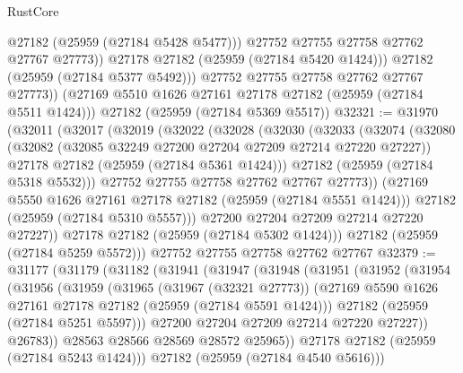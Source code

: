 \begin{lexlean}{RustCore}
\begin{coremodule}
                  @27182
                  (@25959 (@27184 @5428 @5477)))
                @27752
                @27755
                @27758
                @27762
                @27767
                @27773))
            @27178
            @27182
            (@25959 (@27184 @5420 @1424)))
          @27182
          (@25959 (@27184 @5377 @5492)))
        @27752
        @27755
        @27758
        @27762
        @27767
        @27773))
    (@27169 @5510 @1626 @27161 @27178 @27182 (@25959 (@27184 @5511 @1424)))
    @27182
    (@25959 (@27184 @5369 @5517))
@32321 := @31970
    (@32011
      (@32017
        (@32019
          (@32022
            (@32028
              (@32030
                (@32033
                  (@32074
                    (@32080
                      (@32082 (@32085 @32249 @27200 @27204 @27209 @27214 @27220 @27227))
                      @27178
                      @27182
                      (@25959 (@27184 @5361 @1424)))
                    @27182
                    (@25959 (@27184 @5318 @5532)))
                  @27752
                  @27755
                  @27758
                  @27762
                  @27767
                  @27773))
              (@27169 @5550 @1626 @27161 @27178 @27182 (@25959 (@27184 @5551 @1424)))
              @27182
              (@25959 (@27184 @5310 @5557)))
            @27200
            @27204
            @27209
            @27214
            @27220
            @27227))
        @27178
        @27182
        (@25959 (@27184 @5302 @1424)))
      @27182
      (@25959 (@27184 @5259 @5572)))
    @27752
    @27755
    @27758
    @27762
    @27767
@32379 := @31177
    (@31179
      (@31182
        (@31941
          (@31947
            (@31948
              (@31951
                (@31952
                  (@31954
                    (@31956
                      (@31959
                        (@31965
                          (@31967 (@32321 @27773))
                          (@27169 @5590 @1626 @27161 @27178 @27182 (@25959 (@27184 @5591 @1424)))
                          @27182
                          (@25959 (@27184 @5251 @5597)))
                        @27200
                        @27204
                        @27209
                        @27214
                        @27220
                        @27227))
                    @26783))
                @28563
                @28566
                @28569
                @28572
                @25965))
            @27178
            @27182
            (@25959 (@27184 @5243 @1424)))
          @27182
          (@25959 (@27184 @4540 @5616)))

\end{coremodule}
\end{lexlean}
